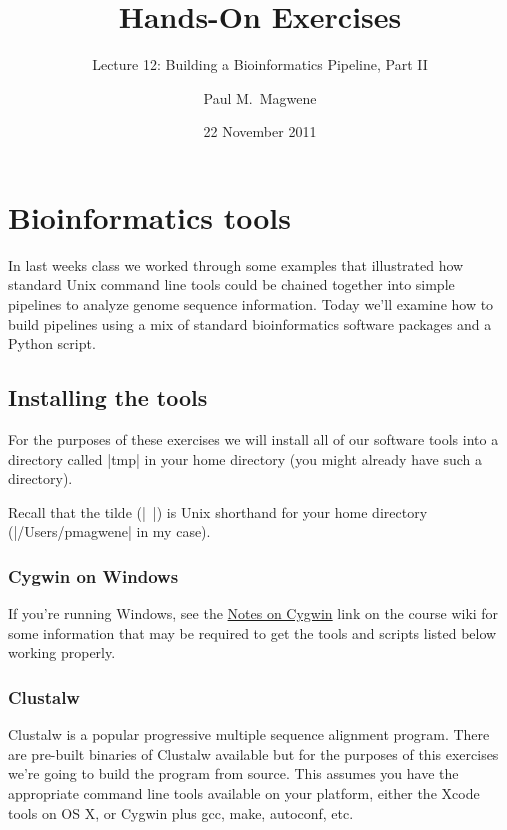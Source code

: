 \documentclass[10pt,letterpaper]{scrartcl}
\author{Paul M.~Magwene}
\title{Hands-On Exercises}
\subtitle{Lecture 12: Building a Bioinformatics Pipeline, Part II}
\date{22 November 2011}
\begin{document}
\maketitle
 
 
\section*{Bioinformatics tools}

In last weeks class we worked through some examples that illustrated how standard Unix command line tools could be chained together into simple pipelines to analyze genome sequence information. Today we'll examine how to build  pipelines using a mix of standard bioinformatics software packages and a Python script.

\subsection*{Installing the tools}

For the purposes of these exercises we will install all of our software tools into a directory called |tmp| in your home directory (you might already have such a directory).
%
%
Recall that the tilde (|~|) is Unix shorthand for your home directory (|/Users/pmagwene| in my case).

\subsubsection*{Cygwin on Windows}

If you're running Windows, see the \href{https://github.com/pmagwene/Bio313/wiki/Cygwin-notes}{Notes on Cygwin} link on the course wiki for some information that may be required to get the tools and scripts listed below working properly.


\subsubsection*{Clustalw}

Clustalw is a popular progressive multiple sequence alignment program.  There are pre-built binaries of Clustalw available but for the purposes of this exercises we're going to build the program from source. This assumes you have the appropriate command line tools available on your platform, either the Xcode tools on OS X, or Cygwin plus gcc, make, autoconf, etc.
\end{document}
